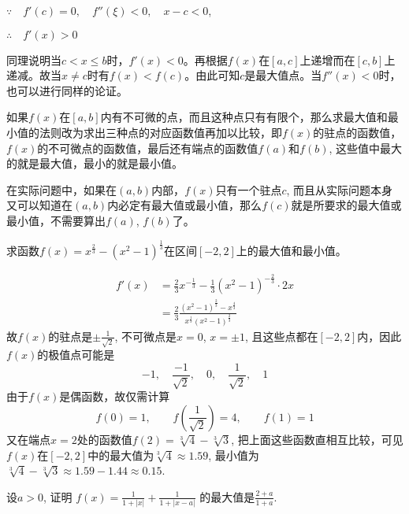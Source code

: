 $\because\quad f' (c) =0,\quad f'' (\xi)<0,\quad x-c<0$,

$\therefore\quad f'(x)>0$

同理说明当$c<x\le b$时，$f'(x)<0$。再根据$f(x)$在$[a,c]$上递增而在$[c,b]$上递减。故当$x\ne c$时有$f(x)<f(c)$。由此可知$c$是最大值点。当$f''(x)<0$时，也可以进行同样的论证。

如果$f(x)$在$[a,b]$内有不可微的点，而且这种点只有有限个，那么求最大值和最小值的法则改为求出三种点的对应函数值再加以比较，即$f(x)$的驻点的函数值，$f(x)$的不可微点的函数值，最后还有端点的函数值$f(a)$和$f(b)$, 这些值中最大的就是最大值，最小的就是最小值。

在实际问题中，如果在$(a,b)$内部，$f(x)$只有一个驻点$c$, 而且从实际问题本身又可以知道在$(a,b)$内必定有最大值或最小值，那么$f(c)$就是所要求的最大值或最小值，不需要算出$f(a)$, $f(b)$了。

\begin{example}
求函数$f(x)=x^{\tfrac{2}{3}}-(x^2-1)^{\tfrac{1}{3}}$在区间$[-2,2]$上的最大值和最小值。
\end{example}


\begin{solution}
\[\begin{split}
f'(x)&=\frac{2}{3}x^{-\tfrac{1}{3}}-\frac{1}{3}(x^2-1)^{-\tfrac{2}{3}}\cdot 2x\\
&=\frac{2}{3} \frac{(x^2-1)^{\tfrac{2}{3}}-x^{\tfrac{4}{3}}}{x^{\tfrac{1}{3}}(x^2-1)^{\tfrac{2}{3}}}    
\end{split}\]
    故$f(x)$的驻点是$\pm\frac{1}{\sqrt{2}}$, 不可微点是$x=0$, $x=\pm 1$, 且这些点都在$[-2, 2]$内，因此$f(x)$的极值点可能是
\[-1,\quad \frac{-1}{\sqrt{2}},\quad  0,\quad \frac{1}{\sqrt{2}},\quad  1\]
    由于$f(x)$是偶函数，故仅需计算
\[    f (0) =1,\qquad f\left(\frac{1}{\sqrt{2}}\right) =4,\qquad f (1) =1\]
    又在端点$x=2$处的函数值$f(2)=\sqrt[3]{4}-\sqrt[3]{3}$, 把上面这些函数直相互比较，可见$f(x)$在$[-2, 2]$中的最大值为$\sqrt[3]{4}\approx 1.59$, 最小值为$\sqrt[3]{4}-\sqrt[3]{3}\approx 1.59-1. 44\approx 0.15$.
\end{solution}

\begin{example}
    设$a>0$, 证明
$    f (x) =\frac{1}{1+|x|}+\frac{1}{1+|x-a|}$
    的最大值是$\frac{2+a}{1+a}$.
\end{example}    

